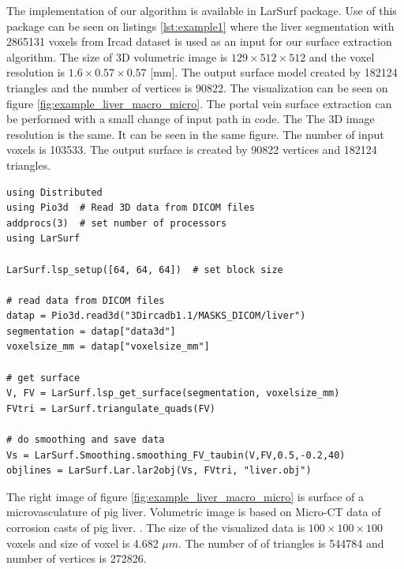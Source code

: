 \documentclass[11pt, oneside]{amsart}   	%
\begin{document}

The implementation of our algorithm is available in LarSurf package. 
Use of this package can be seen on listings \ref{lst:example1} where the liver segmentation with 2865131 voxels from
Ircad dataset is used as an input for our surface extraction algorithm. The size of 3D volumetric 
image is $129 \times 512 \times 512$
and the voxel resolution is $1.6\times0.57\times0.57$ [mm]. 
The output surface model created by  182124 triangles and the number of vertices is 90822. The visualization can 
be seen on figure \ref{fig:example_liver_macro_micro}. 
The portal vein surface extraction can be performed with a small change of input path in code.
The The 3D image resolution is the same. 
It can be seen in the same figure. 
The number of input voxels is 103533. 
The output surface is created by 90822 vertices and 182124 triangles. 

\begin{lstlisting}[caption={Get surface from DICOM volumetric data}, label={lst:example1}]
using Distributed
using Pio3d  # Read 3D data from DICOM files
addprocs(3)  # set number of processors
using LarSurf

LarSurf.lsp_setup([64, 64, 64])  # set block size

# read data from DICOM files
datap = Pio3d.read3d("3Dircadb1.1/MASKS_DICOM/liver")
segmentation = datap["data3d"]
voxelsize_mm = datap["voxelsize_mm"]

# get surface
V, FV = LarSurf.lsp_get_surface(segmentation, voxelsize_mm)
FVtri = LarSurf.triangulate_quads(FV)

# do smoothing and save data
Vs = LarSurf.Smoothing.smoothing_FV_taubin(V,FV,0.5,-0.2,40)
objlines = LarSurf.Lar.lar2obj(Vs, FVtri, "liver.obj")
\end{lstlisting}

The right image of figure \ref{fig:example_liver_macro_micro} is surface of a microvasculature of pig liver. 
Volumetric image is based on Micro-CT data of corrosion casts of pig liver.
\cite{eberlova2017use}.
The size of the visualized data is $100\times100\times100$ voxels and size of voxel is 4.682 $\mu{}m$.
The number of of triangles is 
544784 and number of vertices is 272826.
\end{document}
